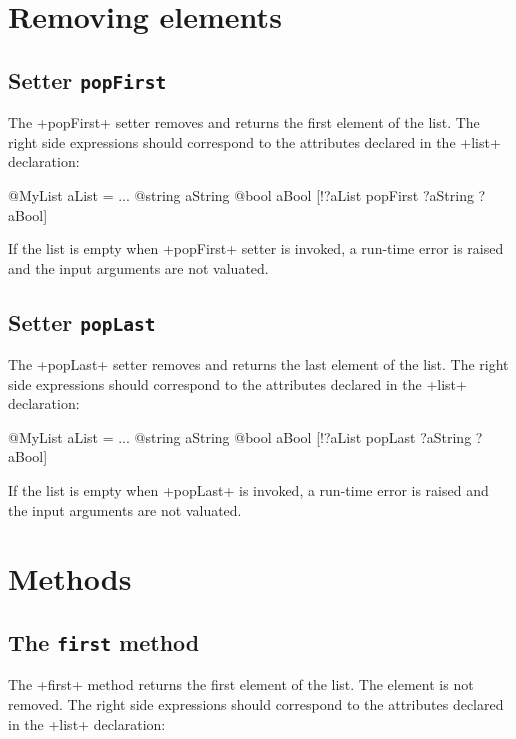 \section{Removing elements}

\subsection{Setter \texttt{popFirst}}


The \ggsq+popFirst+ setter removes and returns the first element of the list. The right side expressions should correspond to the attributes declared in the \ggsq+list+ declaration:

\begin{galgas4}
@MyList aList = ...
@string aString
@bool aBool
[!?aList popFirst ?aString ?aBool]
\end{galgas4}

If the list is empty when \ggsq+popFirst+ setter is invoked, a run-time error is raised and the input arguments are not valuated.

\subsection{Setter \texttt{popLast}}


The \ggsq+popLast+ setter removes and returns the last element of the list. The right side expressions should correspond to the attributes declared in the \ggsq+list+ declaration:

\begin{galgas4}
@MyList aList = ...
@string aString
@bool aBool
[!?aList popLast ?aString ?aBool]
\end{galgas4}

If the list is empty when \ggsq+popLast+ is invoked, a run-time error is raised and the input arguments are not valuated.

\section{Methods}

\subsection{The \texttt{first} method}

The \ggsq+first+ method returns the first element of the list. The element is not removed. The right side expressions should correspond to the attributes declared in the \ggsq+list+ declaration:

